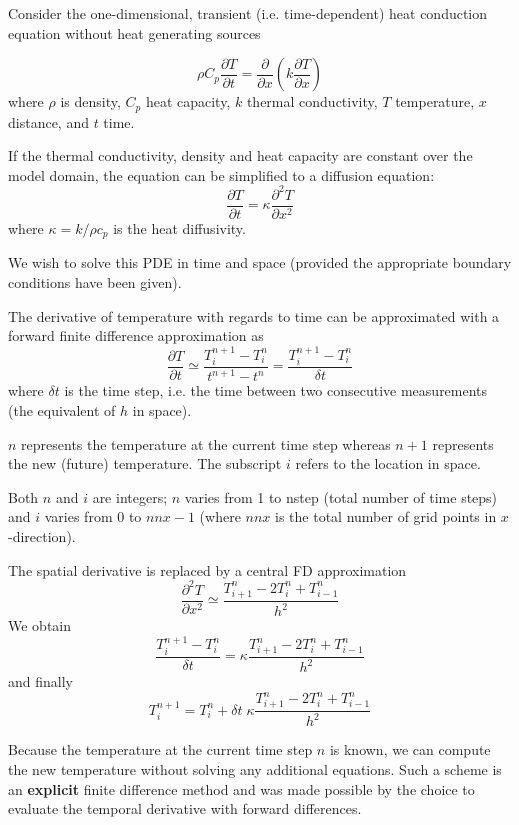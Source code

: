 Consider the one-dimensional, transient (i.e. time-dependent) 
heat conduction equation without heat generating sources

\[
\rho C_p \frac{\partial T}{\partial t} 
= \frac{\partial }{\partial x} \left(  k  \frac{\partial T}{\partial x} \right)
\]
where $\rho$ is density, $C_p$ heat capacity, $k$ thermal conductivity, $T$ temperature, 
$x$ distance, and $t$ time. 

If the thermal conductivity, density and heat capacity are constant over the model domain, 
the equation can be simplified to a diffusion equation:
\[
\frac{\partial T}{\partial t} =  \kappa \frac{\partial^2 T}{\partial x^2} 
\]
where $\kappa=k/\rho c_p$ is the heat diffusivity.

We wish to solve this PDE in time and space (provided the appropriate 
boundary conditions have been given). 


\begin{center}

\end{center}

The derivative of temperature with regards to time can be approximated
with a forward finite difference approximation as
\[
\frac{\partial T}{\partial t} 
\simeq \frac{T_{i}^{n+1}-T_i^n}{t^{n+1}-t^n} 
= \frac{T_{i}^{n+1}-T_i^n}{\delta t} 
\]
where $\delta t$ is the time step, i.e. the time between two consecutive 
measurements (the equivalent of $h$ in space).

$n$ represents the temperature at the current time step whereas $n+1$
represents the new (future) temperature. The subscript $i$ refers to the location in space.

Both $n$ and $i$ are integers; $n$ varies from 1 to nstep (total number of time steps)
and $i$ varies from 0 to $nnx-1$ (where $nnx$ is the total number of grid points in $x$-direction).

The spatial derivative is replaced by a central FD approximation
\[
\frac{\partial^2 T}{\partial x^2} 
\simeq \frac{T_{i+1}^n - 2T_i^n + T_{i-1}^n}{h^2}
\]
We obtain
\[
\frac{T_{i}^{n+1}-T_i^n}{\delta t} 
= \kappa \frac{T_{i+1}^n - 2T_i^n + T_{i-1}^n}{h^2}
\]
and finally
\[
\boxed{
T_i^{n+1}=T_i^n + \delta t \; \kappa \frac{T_{i+1}^n - 2T_i^n + T_{i-1}^n}{h^2}
}
\]

Because the temperature at the current time step $n$ is known,
we can compute the new temperature without solving any additional equations.
Such a scheme is an {\bf explicit} finite difference method and
was made possible by the choice to evaluate the temporal derivative with forward differences.

